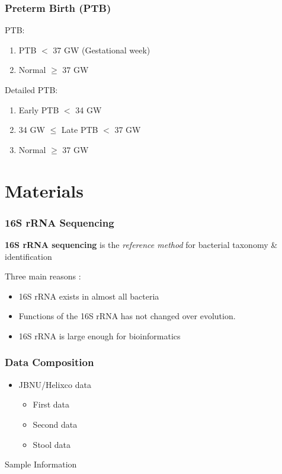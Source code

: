 \documentclass{beamer}
\begin{document}
    \begin{frame}
        \frametitle{Preterm Birth (PTB)}

        PTB:
        \begin{enumerate}
            \item PTB $<$ 37 GW (Gestational week)
            \item Normal $\ge$ 37 GW
        \end{enumerate}

        Detailed PTB:
        \begin{enumerate}
            \item Early PTB $<$ 34 GW
            \item 34 GW $\le$ Late PTB $<$ 37 GW
            \item Normal $\ge$ 37 GW
        \end{enumerate}

        \cite{premature1, premature2}
    \end{frame}

    \section{Materials}
    \begin{frame}
        \frametitle{16S rRNA Sequencing}

        \textbf{16S rRNA sequencing} is the \textit{reference method} for bacterial taxonomy \& identification \cite{16S1}

        Three main reasons \cite{16S2}:
        \begin{itemize}
            \item 16S rRNA exists in almost all bacteria
            \item Functions of the 16S rRNA has not changed over evolution.
            \item 16S rRNA is large enough for bioinformatics
        \end{itemize}
    \end{frame}

    \begin{frame}
        \frametitle{Data Composition}
        \begin{itemize}
            \item JBNU/Helixco data
            \begin{itemize}
                \item First data
                \item Second data
                \item Stool data
            \end{itemize}
        \end{itemize}

        \begin{table}
            \centering
            \caption{Sample Information}
            
        \end{table}
    \end{frame}
\end{document}
